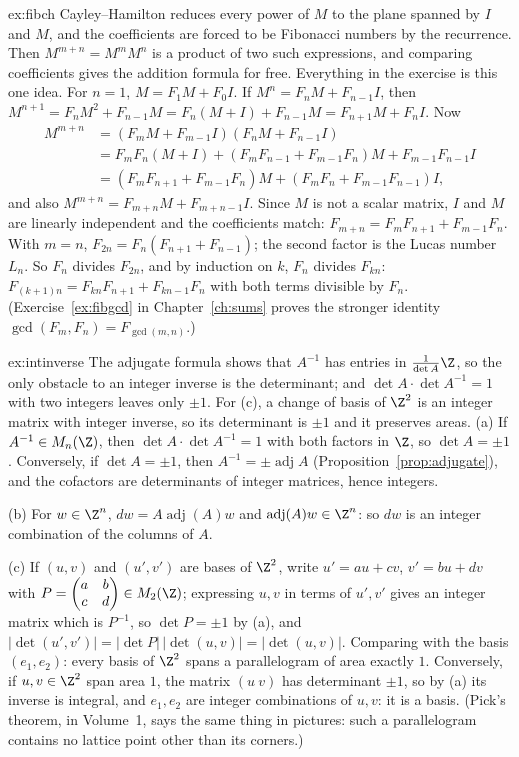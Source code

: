 \begin{solution}{ex:fibch}
\idea Cayley--Hamilton reduces every power of $M$ to the plane spanned by $I$ and $M$, and the coefficients are forced to be Fibonacci numbers by the recurrence. Then $M^{m+n}=M^mM^n$ is a product of two such expressions, and comparing coefficients gives the addition formula for free. Everything in the exercise is this one idea.
\writeup For $n=1$, $M=F_1M+F_0I$. If $M^n=F_nM+F_{n-1}I$, then $M^{n+1}=F_nM^2+F_{n-1}M=F_n(M+I)+F_{n-1}M=F_{n+1}M+F_nI$. Now
\[
\begin{aligned}
M^{m+n}&=(F_mM+F_{m-1}I)(F_nM+F_{n-1}I)\\
&=F_mF_n(M+I)+(F_mF_{n-1}+F_{m-1}F_n)M+F_{m-1}F_{n-1}I\\
&=(F_mF_{n+1}+F_{m-1}F_n)M+(F_mF_n+F_{m-1}F_{n-1})I ,
\end{aligned}
\]
and also $M^{m+n}=F_{m+n}M+F_{m+n-1}I$. Since $M$ is not a scalar matrix, $I$ and $M$ are linearly independent and the coefficients match: $F_{m+n}=F_mF_{n+1}+F_{m-1}F_n$. With $m=n$, $F_{2n}=F_n(F_{n+1}+F_{n-1})$; the second factor is the Lucas number $L_n$. So $F_n$ divides $F_{2n}$, and by induction on $k$, $F_n$ divides $F_{kn}$: $F_{(k+1)n}=F_{kn}F_{n+1}+F_{kn-1}F_n$ with both terms divisible by $F_n$. (Exercise~\ref{ex:fibgcd} in Chapter~\ref{ch:sums} proves the stronger identity $\gcd(F_m,F_n)=F_{\gcd(m,n)}$.)
\end{solution}

\begin{solution}{ex:intinverse}
\idea The adjugate formula shows that $A^{-1}$ has entries in $\frac1{\det A}\Z$, so the only obstacle to an integer inverse is the determinant; and $\det A\cdot\det A^{-1}=1$ with two integers leaves only $\pm1$. For (c), a change of basis of $\Z^2$ is an integer matrix with integer inverse, so its determinant is $\pm1$ and it preserves areas.
\writeup (a) If $A^{-1}\in M_n(\Z)$, then $\det A\cdot\det A^{-1}=1$ with both factors in $\Z$, so $\det A=\pm1$. Conversely, if $\det A=\pm1$, then $A^{-1}=\pm\operatorname{adj}A$ (Proposition~\ref{prop:adjugate}), and the cofactors are determinants of integer matrices, hence integers.

(b) For $w\in\Z^n$, $dw=A\operatorname{adj}(A)w$ and $\operatorname{adj}(A)w\in\Z^n$: so $dw$ is an integer combination of the columns of $A$.

(c) If $(u,v)$ and $(u',v')$ are bases of $\Z^2$, write $u'=au+cv$, $v'=bu+dv$ with $P=\begin{pmatrix}a&b\\c&d\end{pmatrix}\in M_2(\Z)$; expressing $u,v$ in terms of $u',v'$ gives an integer matrix which is $P^{-1}$, so $\det P=\pm1$ by (a), and $|\det(u',v')|=|\det P|\,|\det(u,v)|=|\det(u,v)|$. Comparing with the basis $(e_1,e_2)$: every basis of $\Z^2$ spans a parallelogram of area exactly $1$. Conversely, if $u,v\in\Z^2$ span area $1$, the matrix $(u\ v)$ has determinant $\pm1$, so by (a) its inverse is integral, and $e_1,e_2$ are integer combinations of $u,v$: it is a basis. (Pick's theorem, in Volume~1, says the same thing in pictures: such a parallelogram contains no lattice point other than its corners.)
\end{solution}


